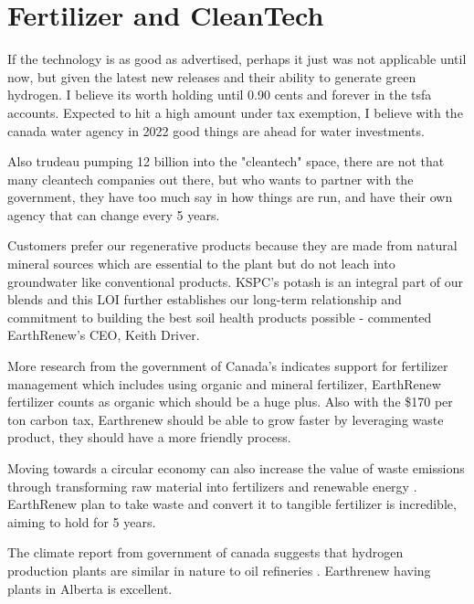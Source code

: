 \section{Fertilizer and CleanTech}

If the technology is as good as advertised, perhaps it just was not applicable until now, but given the latest new releases and their ability to generate green hydrogen. I believe its worth holding until 0.90 cents and forever in the tsfa accounts. Expected to hit a high amount under tax exemption, I believe with the canada water agency in 2022 good things are ahead for water investments.

Also trudeau pumping 12 billion into the "cleantech" space, there are not that many cleantech companies out there, but who wants to partner with the government, they have too much say in how things are run, and have their own agency that can change every 5 years.


 \begin{displayquote}
Customers prefer our regenerative products because they are made from natural mineral sources which are essential to the plant but do not leach into groundwater like conventional products. KSPC’s potash is an integral part of our blends and this LOI further establishes our long-term relationship and commitment to building the best soil health products possible - commented EarthRenew’s CEO, Keith Driver.
    \end{displayquote}
    
    
More research from the government of Canada's \cite{climate_change_2030_emissions} indicates support for fertilizer management which includes using organic and mineral fertilizer, EarthRenew fertilizer counts as organic which should be a huge plus. Also with the \$170 per ton carbon tax, Earthrenew should be able to grow faster by leveraging waste product, they should have a more friendly process.


\begin{blockquote}
Moving towards a circular economy can also increase the value of waste emissions through transforming raw material into fertilizers and renewable energy \cite{climate_change_2030_emissions}. EarthRenew plan to take waste and convert it to tangible fertilizer is incredible, aiming to hold for 5 years.
\end{blockquote}

The climate report from government of canada suggests that hydrogen production plants are similar in nature to oil refineries \cite{climate_change_2030_emissions}. Earthrenew having plants in Alberta is excellent.


